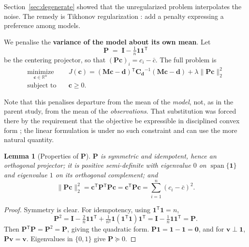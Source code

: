 \documentclass[11pt]{article}
\newcommand{\cvec}{\ensuremath{\mathbf{c}}\xspace}
\newcommand{\dvec}{\ensuremath{\mathbf{d}}\xspace}
\newcommand{\Mmat}{\ensuremath{\mathbf{M}}\xspace}
\newcommand{\Pmat}{\ensuremath{\mathbf{P}}\xspace}
\newcommand{\Imat}{\ensuremath{\mathbf{I}}\xspace}
\newcommand{\onevec}{\ensuremath{\mathbf{1}}\xspace}
\newcommand{\Cd}{\ensuremath{\mathbf{C}_{\mathbf{d}}}\xspace}
\newcommand{\Reals}{\ensuremath{\mathbb{R}}\xspace}
\newcommand{\transpose}{\ensuremath{^{\mathsf{T}}}}
\newtheorem{lemma}[theorem]{Lemma}
\theoremstyle{definition}
\begin{document}
Section~\ref{sec:degenerate} showed that the unregularized problem interpolates the noise. The
remedy is Tikhonov regularization \parencite{tikhonov_solution_1963, hoerl_ridge_1970,
hansen_rank-deficient_1998}: add a penalty expressing a preference among models.

We penalise the \textbf{variance of the model about its own mean}. Let
\begin{equation}
  \Pmat \;=\; \Imat - \tfrac{1}{n}\onevec\onevec\transpose
  \label{eq:P}
\end{equation}
be the centering projector, so that $(\Pmat\cvec)_i = c_i - \bar{c}$. The full problem is
\begin{equation}
  \boxed{\;
  \begin{aligned}
    \underset{\cvec \in \Reals^n}{\text{minimize}} \quad
      & J(\cvec) = (\Mmat\cvec - \dvec)\transpose \Cd^{-1}(\Mmat\cvec - \dvec)
        + \lambda \lVert \Pmat\cvec \rVert_2^2 \\
    \text{subject to} \quad & \cvec \ge 0 .
  \end{aligned}
  \;}
  \label{eq:problem}
\end{equation}

\noindent Note that this penalises departure from the mean of the \textit{model}, not, as in
the parent study, from the mean of the \textit{observations}. That substitution was forced
there by the requirement that the objective be expressible in disciplined convex form
\parencite{boyd_convex_2004, diamond_cvxpy_2016}; the linear formulation is under no such
constraint and can use the more natural quantity.

\begin{lemma}[Properties of $\Pmat$]\label{lem:P}
$\Pmat$ is symmetric and idempotent, hence an orthogonal projector; it is positive
semi-definite with eigenvalue $0$ on $\operatorname{span}\{\onevec\}$ and eigenvalue $1$ on its
orthogonal complement; and
\begin{equation}
  \lVert \Pmat \cvec \rVert_2^2 = \cvec\transpose \Pmat\transpose \Pmat \cvec
  = \cvec\transpose \Pmat \cvec = \sum_{i=1}^n (c_i - \bar{c})^2 .
\end{equation}
\end{lemma}

\begin{proof}
Symmetry is clear. For idempotency, using $\onevec\transpose\onevec = n$,
\[
  \Pmat^2 = \Imat - \tfrac{2}{n}\onevec\onevec\transpose
          + \tfrac{1}{n^2}\onevec(\onevec\transpose\onevec)\onevec\transpose
          = \Imat - \tfrac{1}{n}\onevec\onevec\transpose = \Pmat .
\]
Then $\Pmat\transpose\Pmat = \Pmat^2 = \Pmat$, giving the quadratic form. $\Pmat\onevec =
\onevec - \onevec = \bm{0}$, and for $\mathbf{v} \perp \onevec$, $\Pmat\mathbf{v} =
\mathbf{v}$. Eigenvalues in $\{0,1\}$ give $\Pmat \succeq 0$.
\end{proof}
\end{document}
